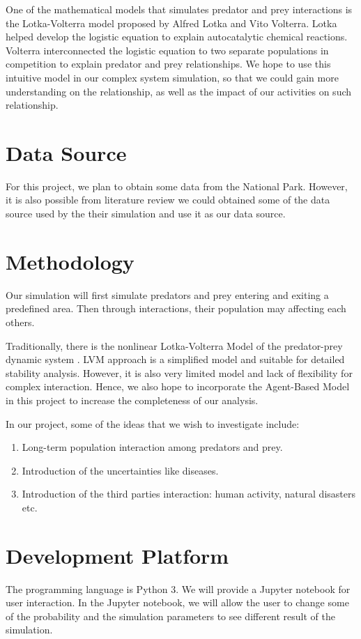 \documentclass{article}
\begin{document}
\begin{normalsize}
		One of the mathematical models that simulates predator and prey interactions is the Lotka-Volterra model proposed by Alfred Lotka and Vito Volterra. Lotka helped develop the logistic equation to explain autocatalytic chemical reactions. Volterra interconnected the logistic equation to two separate populations in competition to explain predator and prey relationships. We hope to use this intuitive model in our complex system simulation,  so that we could gain more understanding on the relationship, as well as the impact of our activities on such relationship.
		
		\section{Data Source}
		For this project, we plan to obtain some data from the National Park. However, it is also possible from literature review we could obtained some of the data source used by the their simulation and use it as our data source.
	
		\section{Methodology}
		Our simulation will first simulate predators and prey entering and exiting a predefined area. Then through interactions, their population may affecting each others.
		
		Traditionally, there is the nonlinear Lotka-Volterra Model of the predator-prey dynamic system \cite{inproceedings, 1102729}. LVM approach is a simplified model and suitable for detailed stability analysis. However, it is also very limited model and lack of flexibility for complex interaction. Hence, we also hope to incorporate the Agent-Based Model \cite{Hodzic} in this project to increase the completeness of our analysis. 
		
		In our project, some of the ideas that we wish to investigate include:
		\begin{enumerate}
			\item Long-term population interaction among predators and prey.
			\item Introduction of the uncertainties like diseases.
			\item Introduction of the third parties interaction: human activity, natural disasters etc.
		\end{enumerate}
		
		\section{Development Platform}
		The programming language is Python 3. We will provide a Jupyter notebook for user interaction.
		In the Jupyter notebook, we will allow the user to change some of the probability and the simulation parameters to see different result of the simulation.
		

\end{normalsize}
\end{document}
